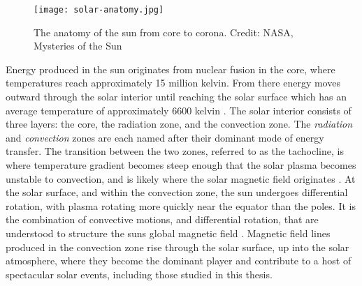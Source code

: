 \begin{figure}
	\texttt{[image: solar-anatomy.jpg]}
	\caption{The anatomy of the sun from core to corona. Credit: NASA, Mysteries of the Sun}
\end{figure} 
 

Energy produced in the sun originates from nuclear fusion in the core, where temperatures reach approximately 15 million kelvin.
From there energy moves outward through the solar interior until reaching the solar surface which has an average temperature of approximately 6600 kelvin  \citep{SolarPhysicsOverview}. 
The solar interior consists of three layers: the core, the radiation zone, and the convection zone.
The \emph{radiation} and \emph{convection} zones are each named after their dominant mode of energy transfer.
The transition between the two zones, referred to as the tachocline, is where temperature gradient becomes steep enough that the solar plasma becomes unstable to convection, and is likely where the solar magnetic field originates \citep{SolarPhysicsOverview}.
At the solar surface, and within the convection zone, the sun undergoes differential rotation, with plasma rotating more quickly near the equator than the poles.
It is the combination of convective motions, and differential rotation, that are understood to structure the suns global magnetic field \citep{Parker1979,Priest2014,JudgeBook}.
Magnetic field lines produced in the convection zone rise through the solar surface, up into the solar atmosphere, where they become the dominant player and contribute to a host of spectacular solar events, including those studied in this thesis.


